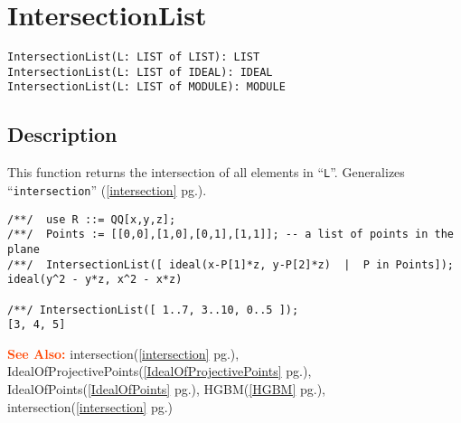 \documentclass[a4paper]{mybook}
\newenvironment{command}{}{} %
\newcommand\SeeAlso{\par\textcolor{OrangeRed}{\textbf{\large See Also: }}}
\begin{document}
\section{IntersectionList}
\label{IntersectionList}
\begin{command} %


\begin{Verbatim}[label=syntax, rulecolor=\color{MidnightBlue},
frame=single]
IntersectionList(L: LIST of LIST): LIST
IntersectionList(L: LIST of IDEAL): IDEAL
IntersectionList(L: LIST of MODULE): MODULE
\end{Verbatim}


\subsection*{Description}

This function returns the intersection of all elements in ``\verb&L&''.
Generalizes ``\verb&intersection&'' (\ref{intersection} pg.\pageref{intersection}).
\begin{Verbatim}[label=example, rulecolor=\color{PineGreen}, frame=single]
/**/  use R ::= QQ[x,y,z];
/**/  Points := [[0,0],[1,0],[0,1],[1,1]]; -- a list of points in the plane
/**/  IntersectionList([ ideal(x-P[1]*z, y-P[2]*z)  |  P in Points]);
ideal(y^2 - y*z, x^2 - x*z)

/**/ IntersectionList([ 1..7, 3..10, 0..5 ]);
[3, 4, 5]
\end{Verbatim}


\SeeAlso %
  intersection(\ref{intersection} pg.\pageref{intersection}), 
    IdealOfProjectivePoints(\ref{IdealOfProjectivePoints} pg.\pageref{IdealOfProjectivePoints}), 
    IdealOfPoints(\ref{IdealOfPoints} pg.\pageref{IdealOfPoints}), 
    HGBM(\ref{HGBM} pg.\pageref{HGBM}), 
    intersection(\ref{intersection} pg.\pageref{intersection})
\end{command} %
\end{document}
